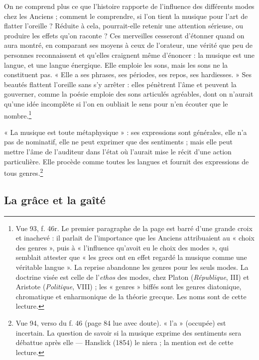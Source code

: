\documentclass[11pt,a4paper]{article}
\begin{document}
On ne comprend plus ce que l'histoire rapporte de l'influence des différents
modes chez les Anciens ; comment le comprendre, si l'on tient la musique pour
l'art de flatter l'oreille ? Réduite à cela, pourrait-elle retenir une attention
sérieuse, ou produire les effets qu'on raconte ? Ces merveilles cesseront d'étonner
quand on aura montré, en comparant ses moyens à ceux de l'orateur, une vérité que
peu de personnes reconnaissent et qu'elles craignent même d'énoncer : la musique
est une langue, et une langue énergique. Elle emploie les sons, mais les sons ne
la constituent pas. « Elle a ses phrases, ses périodes, ses repos, ses
hardiesses. » Ses beautés flattent l'oreille sans s'y arrêter : elles pénètrent
l'âme et peuvent la gouverner, comme la poésie emploie des sons articulés
agréables, dont on n'aurait qu'une idée incomplète si l'on en oubliait le sens pour
n'en écouter que le nombre.\footnote{Vue 93, f. 46r. Le premier paragraphe de la
page est barré d'une grande croix et inachevé : il parlait de l'importance que
les Anciens attribuaient au « choix des genres », puis à « l'influence
qu'avoit eu le choix des modes », qui semblait attester que « les grecs ont en
effet regardé la musique comme une véritable langue ». La reprise abandonne les
genres pour les seuls modes. La doctrine visée est celle de l'\emph{ethos} des
modes, chez Platon (\emph{République}, III) et Aristote (\emph{Politique},
VIII) ; les « genres » biffés sont les genres diatonique, chromatique et
enharmonique de la théorie grecque. Les noms sont de cette lecture.}

« La musique est toute métaphysique » : ses expressions sont générales, elle n'a
pas de nominatif, elle ne peut exprimer que des sentiments ; mais elle peut mettre
l'âme de l'auditeur dans l'état où l'aurait mise le récit d'une action
particulière. Elle procède comme toutes les langues et fournit des expressions
de tous genres.\footnote{Vue 94, verso du f. 46 (page 84 lue avec doute). « l'a »
(occupée) est incertain. La question de savoir si la musique exprime des
sentiments sera débattue après elle — Hanslick (1854) le niera ; la mention est
de cette lecture.}

\subsection*{La grâce et la gaîté}
\end{document}
